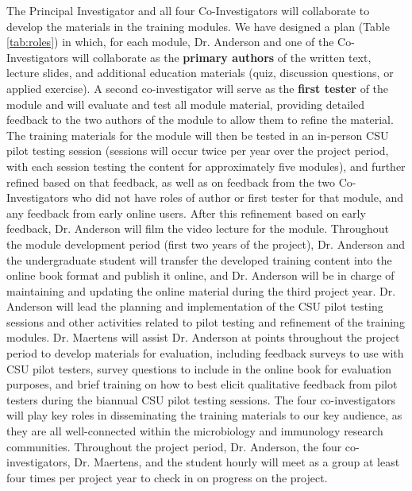 \documentclass[pdftex,english,11.5pt,parskip=half]{scrartcl}
\begin{document}
The Principal Investigator and all four Co-Investigators will collaborate to 
develop the materials in the training modules. We have designed a plan (Table \ref*{tab:roles}) in which, for each module, Dr. Anderson and one of the Co-Investigators will collaborate as the \textbf{primary authors} of the written text, lecture slides, and additional education materials (quiz, discussion questions, or applied exercise). A second co-investigator will serve as the \textbf{first tester} of the module and will evaluate and test all module material, providing detailed feedback to the two authors of the module to allow them to refine the material. The training materials for the module will then be tested in an in-person CSU pilot testing session (sessions will occur twice per year over the project period, with each session testing the content for approximately five modules), and further refined based on that feedback, as well as on feedback from the two Co-Investigators who did not have roles of author or first tester for that module, and any feedback from early online users. After this refinement based on early feedback, Dr. Anderson will film the video lecture for the module.  
Throughout the module development period (first two years of the project), Dr. Anderson and the undergraduate student will transfer the developed training content into the online book format and publish it online, and Dr. Anderson will be in charge of maintaining and updating the online material during the third project year. Dr. Anderson will lead the planning and implementation of the CSU pilot testing sessions and other activities related to pilot testing and refinement of the training modules. Dr. Maertens will assist Dr. Anderson at points throughout the project period to develop materials for evaluation, including feedback surveys to use with CSU pilot testers, survey questions to include in the online book for evaluation purposes, and brief training on how to best elicit qualitative feedback from pilot testers during the biannual CSU pilot testing sessions. The four co-investigators will play key roles in disseminating the training materials to our key audience, as they are all well-connected within the microbiology and immunology research communities. Throughout the project period, Dr. Anderson, the four co-investigators, Dr. Maertens, and the student hourly will meet as a group at least four times per project year to check in on progress on the project. 
\end{document}
